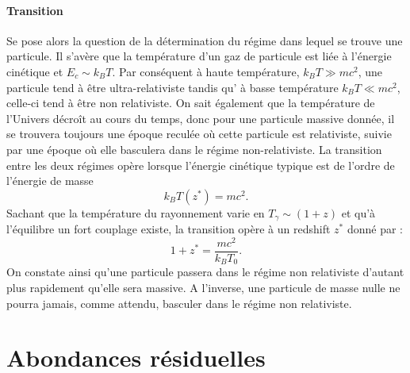 \paragraph{Transition}
Se pose alors la question de la détermination du régime dans lequel se trouve une particule. Il s'avère que la température d'un gaz de particule est liée à l'énergie cinétique et $E_c\sim k_B T$. Par conséquent à haute température, $k_B T\gg mc^2$, une particule tend à être ultra-relativiste tandis qu' à basse température $k_B T\ll mc^2$, celle-ci tend à être non relativiste. On sait également que la température de l'Univers décroît au cours du temps, donc pour une particule massive donnée, il se trouvera toujours une époque reculée où cette particule est relativiste, suivie par une époque où elle basculera dans le régime non-relativiste. La transition entre les deux régimes opère lorsque l'énergie cinétique typique est de l'ordre de l'énergie de masse
\begin{equation}
k_B T(z^*)=mc^2.
\end{equation}
Sachant que la température du rayonnement varie en $T_\gamma\sim (1+z)$ et qu'à l'équilibre un fort couplage existe, la transition opère à un redshift $z^*$ donné par :
\begin{equation}
1+z^*=\frac{mc^2}{k_B T_0}.
\end{equation}
 On constate ainsi qu'une particule passera dans le régime non relativiste d'autant plus rapidement qu'elle sera massive. A l'inverse, une particule de masse nulle ne pourra jamais, comme attendu, basculer dans le régime non relativiste.
 

 
 \section{Abondances résiduelles}
 
